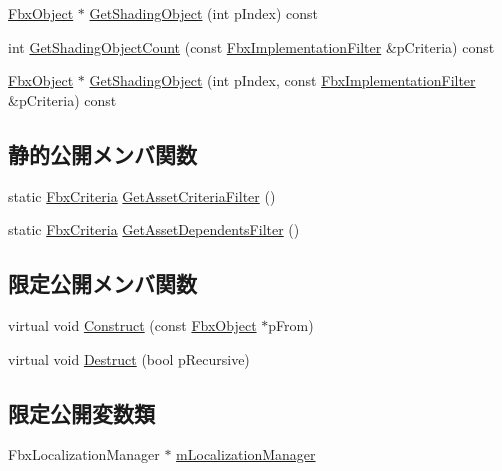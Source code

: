 \begin{DoxyCompactItemize}
\hyperlink{class_fbx_object}{Fbx\+Object} $\ast$ \hyperlink{class_fbx_library_ae7783de818ed0eca3fa34ff6378685fb}{Get\+Shading\+Object} (int p\+Index) const
\item 
int \hyperlink{class_fbx_library_a5b43bbc0e02d7d48628c2dc18980fdd8}{Get\+Shading\+Object\+Count} (const \hyperlink{class_fbx_implementation_filter}{Fbx\+Implementation\+Filter} \&p\+Criteria) const
\item 
\hyperlink{class_fbx_object}{Fbx\+Object} $\ast$ \hyperlink{class_fbx_library_a1eb2147612d1073d6afbf562adfe3c25}{Get\+Shading\+Object} (int p\+Index, const \hyperlink{class_fbx_implementation_filter}{Fbx\+Implementation\+Filter} \&p\+Criteria) const
\end{DoxyCompactItemize}
\subsection*{静的公開メンバ関数}
\begin{DoxyCompactItemize}
\item 
static \hyperlink{class_fbx_criteria}{Fbx\+Criteria} \hyperlink{class_fbx_library_a562702d3ba172e178bf0d63ba5b9974b}{Get\+Asset\+Criteria\+Filter} ()
\item 
static \hyperlink{class_fbx_criteria}{Fbx\+Criteria} \hyperlink{class_fbx_library_a88507d4654d1a906ea7999165af7d92b}{Get\+Asset\+Dependents\+Filter} ()
\end{DoxyCompactItemize}
\subsection*{限定公開メンバ関数}
\begin{DoxyCompactItemize}
\item 
virtual void \hyperlink{class_fbx_library_a8e9fbf97f6753d859411f284db16f964}{Construct} (const \hyperlink{class_fbx_object}{Fbx\+Object} $\ast$p\+From)
\item 
virtual void \hyperlink{class_fbx_library_ad763dd7c511f4c97d1163545de1bbbe9}{Destruct} (bool p\+Recursive)
\end{DoxyCompactItemize}
\subsection*{限定公開変数類}
\begin{DoxyCompactItemize}
\item 
Fbx\+Localization\+Manager $\ast$ \hyperlink{class_fbx_library_ac240173ce32053acf9cc390b82dc69e5}{m\+Localization\+Manager}
\end{DoxyCompactItemize}
